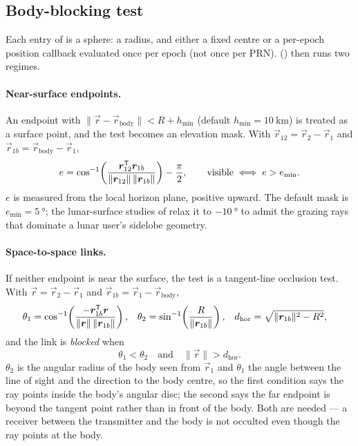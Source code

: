 \subsection{Body-blocking test}
\label{sec:gnss-occultation}

Each entry of  is a sphere: a radius, and either a
fixed centre or a per-epoch position callback evaluated once per epoch (not
once per PRN). 
() then runs two regimes.

\paragraph{Near-surface endpoints.} An endpoint with
$\lVert \vec{r} - \vec{r}_{\mathrm{body}} \rVert < R + h_{\min}$ (default
$h_{\min} = \SI{10}{\kilo\meter}$) is treated as a surface point, and the test
becomes an elevation mask. With $\vec{r}_{12} = \vec{r}_2 - \vec{r}_1$ and
$\vec{r}_{1b} = \vec{r}_{\mathrm{body}} - \vec{r}_1$,
\begin{equation}
  \label{eq:gnss-elevation}
  e = \cos^{-1}\!\left(
      \frac{\bm{r}_{12}^{\mathsf{T}} \bm{r}_{1b}}
           {\lVert\bm{r}_{12}\rVert\,\lVert\bm{r}_{1b}\rVert}
    \right) - \frac{\pi}{2},
  \qquad
  \text{visible} \iff e > e_{\min} .
\end{equation}
$e$ is measured from the local horizon plane, positive upward. The default
mask is $e_{\min} = \SI{5}{\degree}$; the lunar-surface studies of
\citet[Ch.~6]{iiyama2026thesis} relax it to $\SI{-10}{\degree}$ to admit the
grazing rays that dominate a lunar user's sidelobe geometry.

\paragraph{Space-to-space links.} If neither endpoint is near the surface, the
test is a tangent-line occlusion test. With $\vec{r} = \vec{r}_2 - \vec{r}_1$
and $\vec{r}_{1b} = \vec{r}_1 - \vec{r}_{\mathrm{body}}$,
\begin{align}
  \label{eq:gnss-tangent}
  \theta_1 &= \cos^{-1}\!\left(
      \frac{-\bm{r}_{1b}^{\mathsf{T}}\bm{r}}
           {\lVert\bm{r}\rVert\,\lVert\bm{r}_{1b}\rVert} \right),
  &
  \theta_2 &= \sin^{-1}\!\left(
      \frac{R}{\lVert\bm{r}_{1b}\rVert} \right),
  &
  d_{\mathrm{hor}} &= \sqrt{\lVert\bm{r}_{1b}\rVert^2 - R^2},
\end{align}
and the link is \emph{blocked} when
\begin{equation}
  \label{eq:gnss-occulted}
  \theta_1 < \theta_2
  \quad\text{and}\quad
  \lVert\vec{r}\rVert > d_{\mathrm{hor}} .
\end{equation}
$\theta_2$ is the angular radius of the body seen from $\vec{r}_1$ and
$\theta_1$ the angle between the line of sight and the direction to the body
centre, so the first condition says the ray points inside the body's angular
disc; the second says the far endpoint is beyond the tangent point rather than
in front of the body. Both are needed --- a receiver between the transmitter
and the body is not occulted even though the ray points at the body.

